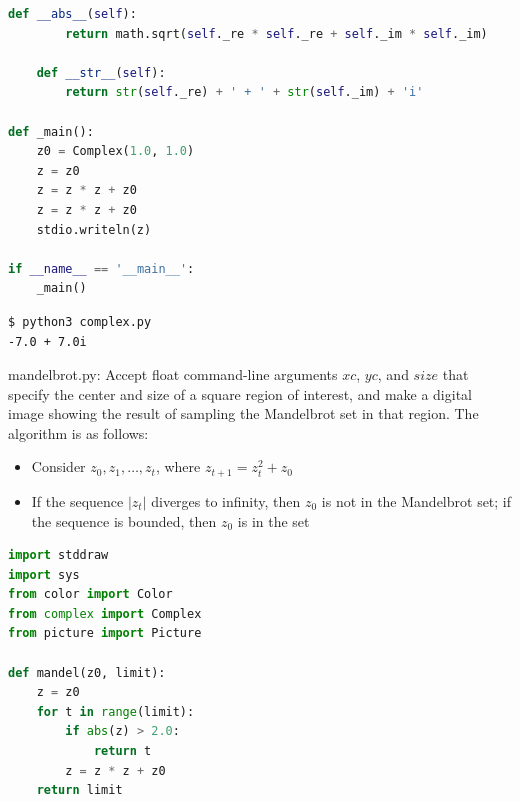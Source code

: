 \documentclass[8pt,a4paper,compress]{beamer}
\begin{document}
\begin{frame}[fragile]
\pause

\begin{lstlisting}[language=python,style=focusin]
    def __abs__(self):
        return math.sqrt(self._re * self._re + self._im * self._im)

    def __str__(self):
        return str(self._re) + ' + ' + str(self._im) + 'i'

def _main():
    z0 = Complex(1.0, 1.0)
    z = z0
    z = z * z + z0
    z = z * z + z0
    stdio.writeln(z)

if __name__ == '__main__':
    _main()
\end{lstlisting}

\pause
\bigskip

\begin{lstlisting}[language={},style=focusin]
$ python3 complex.py 
-7.0 + 7.0i
\end{lstlisting}
\end{frame}

\begin{frame}[fragile]
\pause

\begin{framed}
\tiny mandelbrot.py: Accept float command-line arguments $xc$, $yc$, and $size$ that specify the center and size of a square region of interest, and make a digital image showing the result of sampling the Mandelbrot set in that region. The algorithm is as follows:
\begin{itemize}
\item Consider $z_0, z_1, \dots, z_t$, where $z_{t+1}=z_t^2+z_0$
\item If the sequence $|z_t|$ diverges to infinity, then $z_0$ is not in the Mandelbrot set; if the sequence is bounded, then $z_0$ is in the set
\end{itemize}
\end{framed}

\begin{lstlisting}[language=python,style=focusin]
import stddraw
import sys
from color import Color
from complex import Complex
from picture import Picture

def mandel(z0, limit):
    z = z0
    for t in range(limit):
        if abs(z) > 2.0:
            return t
        z = z * z + z0
    return limit
\end{lstlisting}
\end{frame}
\end{document}
